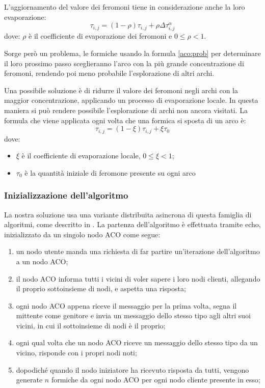 L'aggiornamento del valore dei feromoni tiene in considerazione anche la loro evaporazione:
\begin{equation} \label{aco:update}
    \tau_{i,j} = (1 - \rho) \tau_{i,j} + \rho \Delta \tau_{i,j}^\alpha
\end{equation}
dove: $\rho$ è il coefficiente di evaporazione dei feromoni e $0 \leq \rho < 1$.

Sorge però un problema, le formiche usando la formula \ref{aco:prob} per determinare il loro prossimo passo sceglieranno l'arco con la più grande 
concentrazione di feromoni, rendendo poi meno probabile l'esplorazione di altri archi. 

Una possibile soluzione è di ridurre il valore dei feromoni negli archi con la maggior concentrazione, applicando un processo di evaporazione locale. 
In questa maniera si può rendere possibile l'esplorazione di archi non ancora visitati. 
La formula che viene applicata ogni volta che una formica si sposta di un arco è:
\begin{equation} \label{aco:loss}
    \tau_{i,j} = (1 - \xi ) \tau_{i,j} + \xi \tau_{0}
\end{equation}
dove: 
\begin{itemize}
    \item $\xi$ è il coefficiente di evaporazione locale, $0 \leq \xi < 1$;
    \item $\tau_0$ è la quantità iniziale di feromone presente su ogni arco
\end{itemize}

\subsubsection{Inizializzazione dell'algoritmo}
La nostra soluzione usa una variante distribuita asincrona di questa famiglia di algoritmi, come descritto in \cite{ILIE2013762}.
La partenza dell'algoritmo è effettuata tramite echo, inizializzato da un singolo nodo ACO come segue:
\begin{enumerate}
    \item un nodo utente manda una richiesta di far partire un'iterazione dell'algoritmo a un nodo ACO;
    \item il nodo ACO informa tutti i vicini di voler sapere i loro nodi clienti, allegando il proprio sottoinsieme di nodi, e aspetta una risposta;
    \item ogni nodo ACO appena riceve il messaggio per la prima volta, segna il mittente come genitore e invia un messaggio dello stesso tipo agli altri suoi vicini, in cui il sottoinsieme di nodi è il proprio;
    \item ogni qual volta che un nodo ACO riceve un messaggio dello stesso tipo da un vicino, risponde con i propri nodi noti;
    \item dopodiché quando il nodo iniziatore ha ricevuto risposta da tutti, vengono generate $n$ formiche da ogni nodo ACO per ogni nodo cliente presente in esso; 
\end{enumerate}


